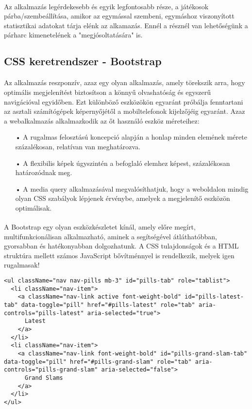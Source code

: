 \paragraph{}
Az alkalmazás legérdekesebb és egyik legfontosabb része, a játékosok párba/szembeállítása, amikor az egymással szembeni, egymáshoz viszonyított statisztikai adatokat tárja elénk az alkamazás. Ennél a résznél van lehetőségünk a párharc kimenetelének a "megjósoltatására" is.

\subsection{CSS keretrendszer - Bootstrap}
\paragraph{}
Az alkalmazás reszponzív, azaz egy olyan alkalmazás, amely törekszik arra, hogy optimális megjelenítést biztosítson a könnyű olvashatóság és egyszerű navigációval egyidőben. Ezt különböző eszközökön egyaránt próbálja fenntartani az asztali számítógépek képernyőjétől a mobiltelefonok kijelzőjéig egyaránt. Azaz a webalkalmazás alkalmazkodik az őt használó eszköz méreteihez:
\begin{enumerate}
\item[•] A rugalmas felosztású koncepció alapján a honlap minden elemének mérete százalékosan, relatívan van meghatározva.
\item[•] A flexibilis képek úgyszintén a befoglaló elemhez képest, százalékosan határozódnak meg.
\item[•] A media query alkalmazásával megvalósíthatjuk, hogy a weboldalon mindig olyan CSS szabályok lépjenek érvénybe, amelyek a megjelenítő eszközön optimálisak.
\end{enumerate}

\paragraph{}
A Bootstrap egy olyan eszközkészletet kínál, amely előre megírt, multifunkcionálisan alkalmazható, aminek a segítségével átláthatóbban, gyorsabban és hatékonyabban dolgozhatunk. A CSS tulajdonságok és a HTML struktúra mellett számos JavaScript bővítménnyel is rendelkezik, melyek igen rugalmasak!

\begin{lstlisting}[caption=Responsive webtervezés - Bootstrap keretrendszer]
<ul className="nav nav-pills mb-3" id="pills-tab" role="tablist">
  <li className="nav-item">
    <a className="nav-link active font-weight-bold" id="pills-latest-tab" data-toggle="pill" href="#pills-latest" role="tab" aria-controls="pills-latest" aria-selected="true"> 
      Latest 
    </a>
  </li>
  <li className="nav-item">
    <a className="nav-link font-weight-bold" id="pills-grand-slam-tab" data-toggle="pill" href="#pills-grand-slam" role="tab" aria-controls="pills-grand-slam" aria-selected="false"> 
      Grand Slams 
    </a>
  </li>
</ul>
\end{lstlisting}

